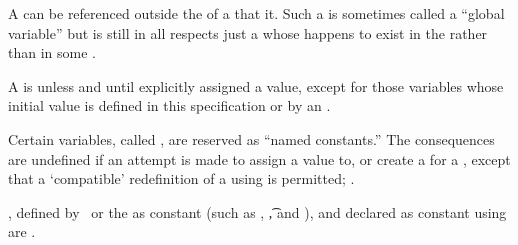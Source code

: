 
A  can be referenced outside the  of
a  that  it.  Such a  is sometimes called 
a ``global variable'' but is still in all respects just a 
whose  happens to exist in the  rather than in some
.

A  is 
unless and until explicitly assigned a value, except for 
those variables whose initial value is 
defined in this specification or by an .


\endsubsubsubsubsection%


Certain variables, called , are reserved as ``named constants.''  
The consequences are undefined if an attempt is made to 
    assign a value to,
 or create
a  for a , 
except that a `compatible' redefinition of a 
using  is permitted; .

, 
 defined by \clisp\ or the 
  as constant (such as \nil, \t, and ),
and  declared as constant using 
are .

\endsubsubsubsubsection%



